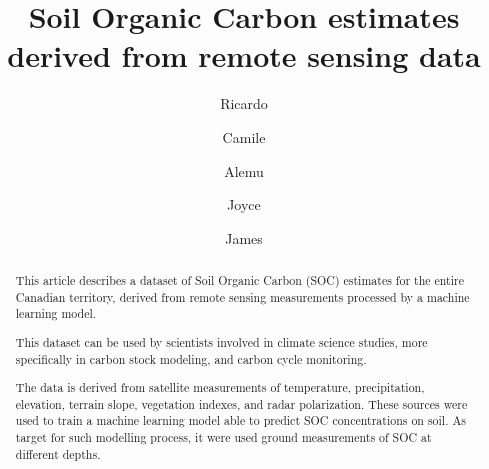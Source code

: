 \documentclass[times,final]{elsarticle.cls}
\begin{document}

\begin{frontmatter}

\title{Soil Organic Carbon estimates derived from remote sensing data}%

\author[1]{Ricardo }
\author[1]{Camile }
% 
\author[1]{Alemu }

\author[2]{Joyce }
\author[2]{James }

\address[1]{School of Earth, Environment \& Society, McMaster University, Hamilton, Ontario, Canada}
\address[2]{World Wildlife Fund Canada, Toronto, Ontario, Canada}



\begin{abstract}

This article describes a dataset of Soil Organic Carbon (SOC) estimates for the entire Canadian territory, derived from remote sensing measurements processed by a machine learning model. 

This dataset can be used by scientists involved in climate science studies, more specifically in carbon stock modeling, and carbon cycle monitoring. 

The data is derived from satellite measurements of temperature, precipitation, elevation, terrain slope, vegetation indexes, and radar polarization. These sources were used to train a machine learning model able to predict SOC concentrations on soil. As target for such modelling process, it were used ground measurements of SOC at different depths.


\end{abstract}
\end{frontmatter}
\end{document}
